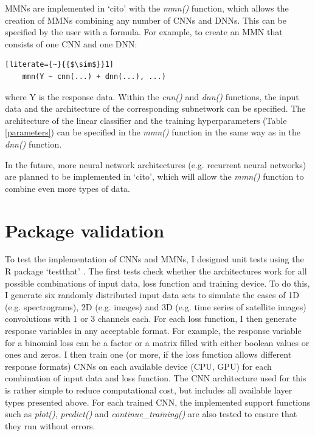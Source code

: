 \documentclass[12pt,twoside]{scrreport}
\newcommand{\pkg}[1]{`#1'}
\newcommand{\fn}[2][]{\textit{#2(}#1\textit{)}}
\begin{document}
MMNs are implemented in \pkg{cito} with the \fn{mmn} function, which allows the creation of MMNs combining any number of CNNs and DNNs. This can be specified by the user with a formula. For example, to create an MMN that consists of one CNN and one DNN:

\begin{lstlisting}[literate={~}{{$\sim$}}1]
	mmn(Y ~ cnn(...) + dnn(...), ...)
\end{lstlisting}

where Y is the response data. Within the \fn{cnn} and \fn{dnn} functions, the input data and the architecture of the corresponding subnetwork can be specified. The architecture of the linear classifier and the training hyperparameters (Table \ref{parameters}) can be specified in the \fn{mmn} function in the same way as in the \fn{dnn} function.

In the future, more neural network architectures (e.g. recurrent neural networks) are planned to be implemented in \pkg{cito}, which will allow the \fn{mmn} function to combine even more types of data. 

\section*{Package validation}
To test the implementation of CNNs and MMNs, I designed unit tests using the R package \pkg{testthat} \citep{wickhamTestthatGetStarted2011}. The first tests check whether the architectures work for all possible combinations of input data, loss function and training device. To do this, I generate six randomly distributed input data sets to simulate the cases of 1D (e.g. spectrograms), 2D (e.g. images) and 3D (e.g. time series of satellite images) convolutions with 1 or 3 channels each. For each loss function, I then generate response variables in any acceptable format. For example, the response variable for a binomial loss can be a factor or a matrix filled with either boolean values or ones and zeros. I then train one (or more, if the loss function allows different response formats) CNNs on each available device (CPU, GPU) for each combination of input data and loss function. The CNN architecture used for this is rather simple to reduce computational cost, but includes all available layer types presented above. For each trained CNN, the implemented support functions such as \fn{plot}, \fn{predict} and \fn{continue\_training} are also tested to ensure that they run without errors.
\end{document}
